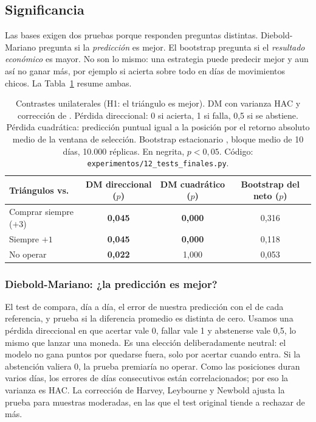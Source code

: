 \documentclass[10pt,a4paper]{article}
\newcommand{\ruta}[1]{\nolinkurl{#1}}
\begin{document}
\subsection{Significancia}\label{sec:significancia}

Las bases exigen dos pruebas porque responden preguntas distintas. Diebold-Mariano
pregunta si la \emph{predicción} es mejor. El bootstrap pregunta si el \emph{resultado
económico} es mayor. No son lo mismo: una estrategia puede predecir mejor y aun así no
ganar más, por ejemplo si acierta sobre todo en días de movimientos chicos. La
Tabla~\ref{tab:sig} resume ambas.

\begin{table}[htb]\centering\small
\begin{tabular}{@{}lccc@{}}
\toprule
Triángulos vs. & DM direccional ($p$) & DM cuadrático ($p$) & Bootstrap del neto ($p$) \\
\midrule
Comprar siempre ($+3$) & \textbf{0{,}045} & \textbf{0{,}000} & 0{,}316 \\
Siempre $+1$           & \textbf{0{,}045} & \textbf{0{,}000} & 0{,}118 \\
No operar            & \textbf{0{,}022} & 1{,}000 & 0{,}053 \\
\bottomrule
\end{tabular}
\caption{Contrastes unilaterales (H1: el triángulo es mejor). DM con varianza HAC
\citep{neweywest1987} y corrección de \citet{hln1997}. Pérdida direccional: 0 si
acierta, 1 si falla, 0,5 si se abstiene. Pérdida cuadrática: predicción puntual igual a
la posición por el retorno absoluto medio de la ventana de selección. Bootstrap
estacionario \citep{politisromano1994}, bloque medio de 10 días, 10.000 réplicas. En
negrita, $p<0{,}05$. Código: \ruta{experimentos/12_tests_finales.py}.}\label{tab:sig}
\end{table}

\subsubsection{Diebold-Mariano: ¿la predicción es mejor?}

El test de \citet{dm1995} compara, día a día, el error de nuestra predicción con el de
cada referencia, y prueba si la diferencia promedio es distinta de cero. Usamos una
pérdida direccional en que acertar vale 0, fallar vale 1 y abstenerse vale 0,5, lo mismo
que lanzar una moneda. Es una elección deliberadamente neutral: el modelo no gana puntos
por quedarse fuera, solo por acertar cuando entra. Si la abstención valiera 0, la prueba
premiaría no operar. Como las posiciones duran varios días, los errores de días
consecutivos están correlacionados; por eso la varianza es HAC. La corrección de Harvey,
Leybourne y Newbold ajusta la prueba para muestras moderadas, en las que el test
original tiende a rechazar de más.
\end{document}
